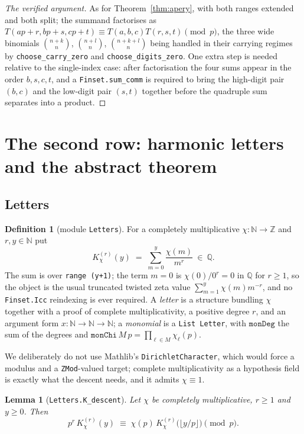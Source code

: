 \documentclass[11pt,reqno]{amsart}
\theoremstyle{plain}
\newtheorem{lemma}[theorem]{Lemma}
\theoremstyle{definition}
\newtheorem{definition}[theorem]{Definition}
\theoremstyle{remark}
\newcommand{\Z}{\mathbb{Z}}
\newcommand{\Q}{\mathbb{Q}}
\newcommand{\N}{\mathbb{N}}
\newcommand{\bin}[2]{\binom{#1}{#2}}
\newcommand{\Ln}[1]{\texttt{#1}}
\numberwithin{equation}{section}
\begin{document}
\begin{proof}[The verified argument]
As for Theorem~\ref{thm:apery}, with both ranges extended and both split; the summand
factorises as $T(ap+r,bp+s,cp+t)\equiv T(a,b,c)T(r,s,t)\pmod p$, the three wide binomials
$\bin{n+k}n$, $\bin{n+l}n$, $\bin{n+k+l}n$ being handled in their carrying regimes by
\Ln{choose\_carry\_zero} and \Ln{choose\_digits\_zero}. One extra step is needed
relative to the single-index case: after factorisation the four sums appear in the order
$b,s,c,t$, and a \Ln{Finset.sum\_comm} is required to bring the high-digit pair $(b,c)$ and
the low-digit pair $(s,t)$ together before the quadruple sum separates into a product.
\end{proof}

\section{The second row: harmonic letters and the abstract theorem}
\label{sec:LB}

\subsection{Letters}

\begin{definition}[module \Ln{Letters}]\label{def:letter}
For a completely multiplicative $\chi:\N\to\Z$ and $r,y\in\N$ put
\[
   K_\chi^{(r)}(y)\;=\;\sum_{m=0}^{y}\frac{\chi(m)}{m^{r}}\ \in\ \Q .
\]
The sum is over \Ln{range (y+1)}; the term $m=0$ is $\chi(0)/0^r=0$ in $\Q$ for $r\ge1$, so
the object is the usual truncated twisted zeta value $\sum_{m=1}^y\chi(m)m^{-r}$, and no
\Ln{Finset.Icc} reindexing is ever required. A \emph{letter} is a structure bundling $\chi$
together with a proof of complete multiplicativity, a positive degree $r$, and an argument
form $x:\N\to\N\to\N$; a \emph{monomial} is a \Ln{List Letter}, with $\Ln{monDeg}$ the sum of
the degrees and $\Ln{monChi}\,M\,p=\prod_{\ell\in M}\chi_\ell(p)$.
\end{definition}

We deliberately do not use Mathlib's \Ln{DirichletCharacter}, which would force a modulus and
a \Ln{ZMod}-valued target; complete multiplicativity as a hypothesis field is exactly what
the descent needs, and it admits $\chi\equiv1$.

\begin{lemma}[\Ln{Letters.K\_descent}]\label{lem:K}
Let $\chi$ be completely multiplicative, $r\ge1$ and $y\ge0$. Then
\[
   p^{r}\,K^{(r)}_\chi(y)\;\equiv\;\chi(p)\,K^{(r)}_\chi\bigl(\lfloor y/p\rfloor\bigr)
   \pmod p .
\]
\end{lemma}
\end{document}
